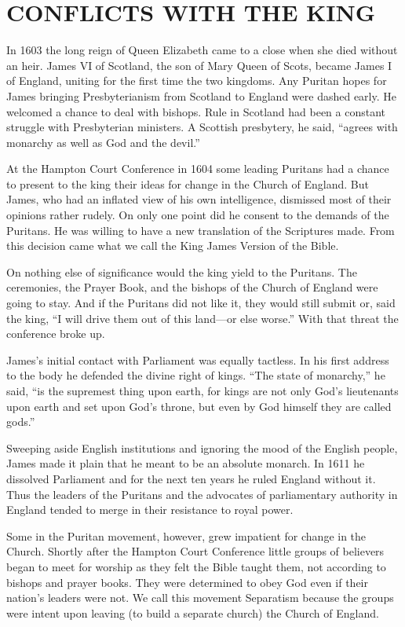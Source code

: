 \section{CONFLICTS WITH THE KING}

In 1603 the long reign of Queen Elizabeth came to a close when she died without an heir. James VI of
Scotland, the son of Mary Queen of Scots, became James I of England, uniting for the first time the
two kingdoms. Any Puritan hopes for James bringing Presbyterianism from Scotland to England were
dashed early. He welcomed a chance to deal with bishops. Rule in Scotland had been a constant
struggle with Presbyterian ministers. A Scottish presbytery, he said, “agrees with monarchy as well
as God and the devil.”

At the Hampton Court Conference in 1604 some leading Puritans had a chance to present to the king
their ideas for change in the Church of England. But James, who had an inflated view of his own
intelligence, dismissed most of their opinions rather rudely. On only one point did he consent to
the demands of the Puritans. He was willing to have a new translation of the Scriptures made. From
this decision came what we call the King James Version of the Bible.

On nothing else of significance would the king yield to the Puritans. The ceremonies, the Prayer
Book, and the bishops of the Church of England were going to stay. And if the Puritans did not like
it, they would still submit or, said the king, “I will drive them out of this land—or else worse.”
With that threat the conference broke up.

James’s initial contact with Parliament was equally tactless. In his first address to the body he
defended the divine right of kings. “The state of monarchy,” he said, “is the supremest thing upon
earth, for kings are not only God’s lieutenants upon earth and set upon God’s throne, but even by
God himself they are called gods.”

Sweeping aside English institutions and ignoring the mood of the English people, James made it plain
that he meant to be an absolute monarch. In 1611 he dissolved Parliament and for the next ten years
he ruled England without it. Thus the leaders of the Puritans and the advocates of parliamentary
authority in England tended to merge in their resistance to royal power.

Some in the Puritan movement, however, grew impatient for change in the Church. Shortly after the
Hampton Court Conference little groups of believers began to meet for worship as they felt the Bible
taught them, not according to bishops and prayer books. They were determined to obey God even if
their nation’s leaders were not. We call this movement Separatism because the groups were intent
upon leaving (to build a separate church) the Church of England.

